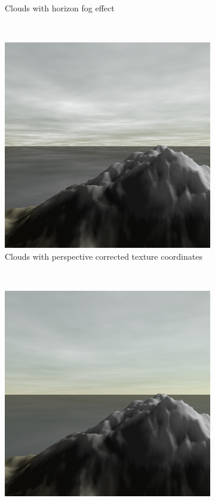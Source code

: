 \documentclass{article}
\begin{document}
\begin{figure}[H]
\begin{subfigure}[b]{0.45\textwidth}
        \caption{Clouds with horizon fog effect}
        \label{fig:cloudFog}
    \end{subfigure}
    ~
    \begin{subfigure}[b]{0.45\textwidth}
        \centering
        \includegraphics[scale=0.25]{cloudProj}
        \caption{Clouds with perspective corrected texture coordinates}
        \label{fig:cloudProj}
    \end{subfigure}
    ~
    \begin{subfigure}[b]{0.45\textwidth}
        \centering
        \includegraphics[scale=0.25]{cloudProjFog}

\end{subfigure}
\end{figure}
\end{document}
